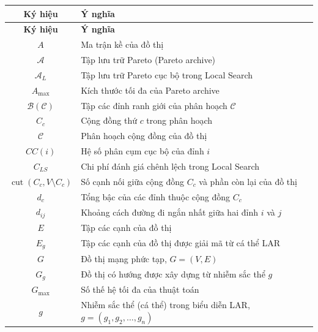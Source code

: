 \documentclass[14pt,a4paper]{extarticle}
\begin{document}
\begin{longtable}{|c|p{}|}

    \hline
    \textbf{Ký hiệu} & \textbf{Ý nghĩa} \\ \hline
    \endfirsthead

    \hline
    \textbf{Ký hiệu} & \textbf{Ý nghĩa} \\ \hline
    \endhead

    \hline
    \endfoot

    \hline
    \endlastfoot

    $A$ & Ma trận kề của đồ thị \\ \hline
    $\mathcal{A}$ & Tập lưu trữ Pareto (Pareto archive) \\ \hline
    $\mathcal{A}_L$ & Tập lưu trữ Pareto cục bộ trong Local Search \\ \hline
    $A_{\max}$ & Kích thước tối đa của Pareto archive \\ \hline
    $\mathcal{B}(\mathcal{C})$ & Tập các đỉnh ranh giới của phân hoạch $\mathcal{C}$ \\ \hline
    $C_c$ & Cộng đồng thứ $c$ trong phân hoạch \\ \hline
    $\mathcal{C}$ & Phân hoạch cộng đồng của đồ thị \\ \hline
    $CC(i)$ & Hệ số phân cụm cục bộ của đỉnh $i$ \\ \hline
    $C_{LS}$ & Chi phí đánh giá chênh lệch trong Local Search \\ \hline
    $\operatorname{cut}(C_c, V \setminus C_c)$ & Số cạnh nối giữa cộng đồng $C_c$ và phần còn lại của đồ thị \\ \hline
    $d_c$ & Tổng bậc của các đỉnh thuộc cộng đồng $C_c$ \\ \hline
    $d_{ij}$ & Khoảng cách đường đi ngắn nhất giữa hai đỉnh $i$ và $j$ \\ \hline
    $E$ & Tập các cạnh của đồ thị \\ \hline
    $E_g$ & Tập các cạnh của đồ thị được giải mã từ cá thể LAR \\ \hline
    $G$ & Đồ thị mạng phức tạp, $G=(V,E)$ \\ \hline
    $G_g$ & Đồ thị có hướng được xây dựng từ nhiễm sắc thể $g$ \\ \hline
    $G_{\max}$ & Số thế hệ tối đa của thuật toán \\ \hline
    $g$ & Nhiễm sắc thể (cá thể) trong biểu diễn LAR, $g=(g_1, g_2, \ldots, g_n)$ \\ \hline

\end{longtable}
\end{document}
